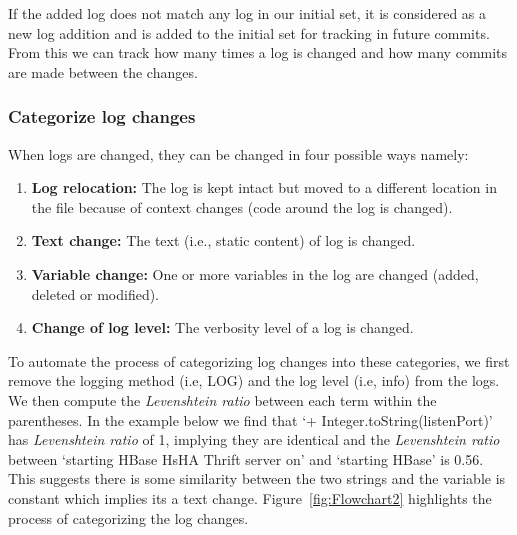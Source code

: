 If the added log does not match any log in our initial set, it is considered as a new log addition and is added to the initial set for tracking in future commits. From this we can track how many times a log is changed and how many commits are made between the changes. 



\subsubsection{Categorize log changes}

When logs are changed, they can be changed in four possible ways namely:
\begin{enumerate}
	
	\item { \textbf{Log relocation:} } The log is kept intact but moved to a different location in the file because of context changes (code around the log is changed).
	
	\item \textbf{Text change:} The text (i.e., static content) of log is changed. 
	
	\item\textbf{Variable change:} One or more variables in the log are changed (added, deleted or modified).
	
	\item \textbf{Change of log level:} The verbosity level of a log is changed.
	
	
\end{enumerate}


To automate the process of categorizing log changes into these categories, we first remove the logging method (i.e, LOG) and the log level (i.e, info) from the logs. We then compute the \textsl{Levenshtein ratio} between each term within the parentheses. In the example below we find that `+ Integer.toString(listenPort)' has \textsl{Levenshtein ratio} of 1, implying they are identical and the \textsl{Levenshtein ratio} between `starting HBase HsHA Thrift server on' and `starting HBase' is 0.56. This suggests there is some similarity between the two strings and the variable is constant which implies its a text change. Figure~\ref{fig:Flowchart2} highlights the process of categorizing the log changes.

